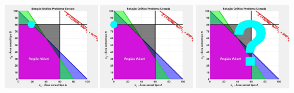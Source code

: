 \begin{frame}
{	}
	\only<7>
	{
		\centering
		\includegraphics[width=4.2cm,height=4.2cm]{Exaustiva_6.jpeg}
	}
	\only<8>
	{
		\centering
		\includegraphics[width=4.2cm,height=4.2cm]{Exaustiva_7.jpeg}
	}
	\only<9->
	{
		\centering
		\includegraphics[width=4.2cm,height=4.2cm]{Exaustiva_1.jpeg}
	}


\end{frame}
